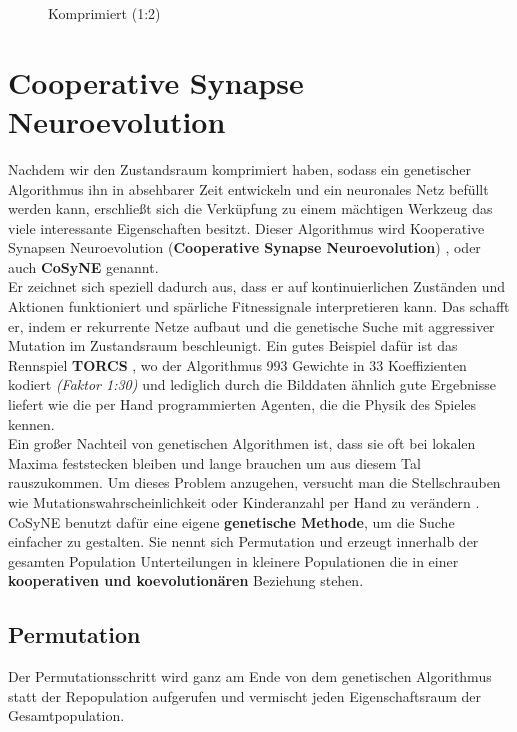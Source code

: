 \begin{multicols}{2}
\begin{figure}[H]
\begin{center}
                        \caption{Komprimiert (1:2)}\label{fig:dct-after}
                    \end{center}
                \end{figure}
            \end{multicols}

\newpage

    \section{Cooperative Synapse Neuroevolution} \label{cosyne-definition}
        Nachdem wir den Zustandsraum komprimiert haben, sodass ein genetischer Algorithmus ihn in absehbarer Zeit entwickeln und ein neuronales Netz befüllt werden kann, erschließt sich die Verküpfung zu einem mächtigen Werkzeug das viele interessante Eigenschaften besitzt. Dieser Algorithmus wird Kooperative Synapsen Neuroevolution (\textbf{Cooperative Synapse Neuroevolution}) \cite{cosyne2}, oder auch \textbf{CoSyNE} genannt.\\

        \noindent
        Er zeichnet sich speziell dadurch aus, dass er auf kontinuierlichen Zuständen und Aktionen funktioniert und spärliche Fitnessignale interpretieren kann. Das schafft er, indem er rekurrente Netze aufbaut und die genetische Suche mit aggressiver Mutation im Zustandsraum beschleunigt. Ein gutes Beispiel dafür ist das Rennspiel \textbf{TORCS} \cite{cosyne3}, wo der Algorithmus 993 Gewichte in 33 Koeffizienten kodiert \textit{(Faktor 1:30)} und lediglich durch die Bilddaten ähnlich gute Ergebnisse liefert wie die per Hand programmierten Agenten, die die Physik des Spieles kennen.\\

        \noindent
        Ein großer Nachteil von genetischen Algorithmen ist, dass sie oft bei lokalen Maxima feststecken bleiben und lange brauchen um aus diesem Tal rauszukommen. Um dieses Problem anzugehen, versucht man die Stellschrauben wie Mutationswahrscheinlichkeit oder Kinderanzahl per Hand zu verändern \cite{grefenstette86}. CoSyNE benutzt dafür eine eigene \textbf{genetische Methode}, um die Suche einfacher zu gestalten. Sie nennt sich Permutation und erzeugt innerhalb der gesamten Population Unterteilungen in kleinere Populationen die in einer \textbf{kooperativen und koevolutionären} Beziehung stehen.
        \subsection{Permutation}
            Der Permutationsschritt wird ganz am Ende von dem genetischen Algorithmus statt der Repopulation aufgerufen und vermischt jeden \colorbox{green!25}{Eigenschaftsraum} der Gesamtpopulation. 

